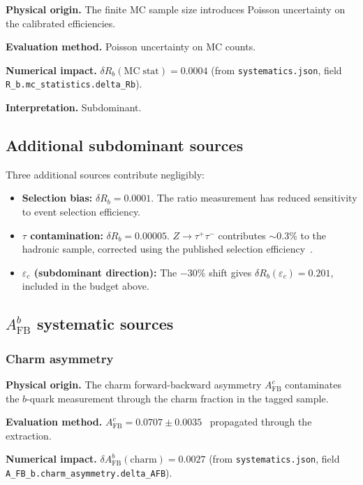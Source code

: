 \documentclass[11pt,a4paper]{article}
\begin{document}
\textbf{Physical origin.} The finite MC sample size introduces Poisson uncertainty on
the calibrated efficiencies.

\textbf{Evaluation method.} Poisson uncertainty on MC counts.

\textbf{Numerical impact.}
$\delta R_b(\mathrm{MC\;stat}) = 0.0004$
(from \texttt{systematics.json}, field \texttt{R\_b.mc\_statistics.delta\_Rb}).

\textbf{Interpretation.} Subdominant.

\subsection{Additional subdominant sources}
\label{sec:syst_minor}

Three additional sources contribute negligibly:
\begin{itemize}
\item \textbf{Selection bias:}
$\delta R_b = 0.0001$. The ratio measurement has reduced sensitivity
to event selection efficiency.
\item \textbf{$\tau$ contamination:}
$\delta R_b = 0.00005$. $Z \to \tau^+\tau^-$ contributes $\sim 0.3\%$ to the
hadronic sample, corrected using the published selection efficiency~\cite{ALEPH:sigma_had}.
\item \textbf{$\varepsilon_c$ (subdominant direction):} The $-30\%$ shift gives
$\delta R_b(\varepsilon_c) = 0.201$, included in the budget above.
\end{itemize}

\subsection{$A_\mathrm{FB}^b$ systematic sources}
\label{sec:syst_afb}

\subsubsection{Charm asymmetry}
\label{sec:syst_charm_asym}

\textbf{Physical origin.} The charm forward-backward asymmetry $A_\mathrm{FB}^c$ contaminates
the $b$-quark measurement through the charm fraction in the tagged sample.

\textbf{Evaluation method.} $A_\mathrm{FB}^c = 0.0707 \pm 0.0035$~\cite{LEP:EWWG:2005}
propagated through the extraction.

\textbf{Numerical impact.}
$\delta A_\mathrm{FB}^b(\mathrm{charm}) = 0.0027$
(from \texttt{systematics.json}, field \texttt{A\_FB\_b.charm\_asymmetry.delta\_AFB}).
\end{document}
